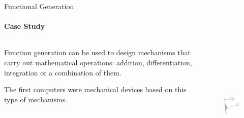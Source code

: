 \documentclass[aspectratio=169]{beamer}
\begin{document}
\begin{frame}[t]{Functional Generation}
\framesubtitle{Case Study}
    \begin{columns}[T,onlytextwidth]
        \begin{column}{0.49\textwidth}
            Function generation can be used to design mechanisms that carry out mathematical operations: addition, differentiation, integration or a combination of them. \smallskip

            The first computers were mechanical devices based on this type of mechanisms.
        \end{column}
        \begin{column}{0.49\textwidth}
            \vspace{-1cm}
            \begin{figure}[H]
                \centering\includegraphics[height=6cm,width=1\textwidth,keepaspectratio]{func_gen2.png}
                \label{fig:func_gen2.png}
            \end{figure}
        \end{column}
    \end{columns}
\end{frame}
\end{document}
